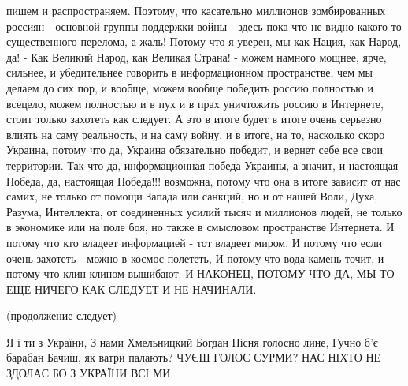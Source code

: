 пишем и распространяем. Поэтому, что касательно миллионов зомбированных россиян
- основной группы поддержки войны - здесь пока что не видно какого то
существенного перелома, а жаль! Потому что я уверен, мы как Нация, как Народ, да! - Как Великий Народ, как Великая Страна! -
можем намного мощнее, ярче, сильнее, и убедительнее говорить в информационном
пространстве, чем мы делаем до сих пор, и вообще, можем вообще победить россию
полностью и всецело, можем полностью и в пух и в прах уничтожить россию в
Интернете, стоит только захотеть как следует. А это в итоге будет в итоге очень серьезно влиять на саму реальность, и на саму войну, и в итоге, на то, насколько скоро Украина, потому что да, Украина обязательно победит, и вернет себе все свои территории. Так что да, информационная победа Украины, а значит, и настоящая Победа, да, настоящая Победа!!! возможна, потому что она в итоге зависит от нас самих, не только от помощи Запада или санкций, но и от нашей Воли, Духа, Разума, Интеллекта, от соединенных усилий тысяч и миллионов людей, не только в экономике или на поле боя, но также в смысловом пространстве Интернета. И потому что кто владеет информацией - тот владеет миром. И потому что если очень захотеть - можно в космос полететь, И потому что вода камень точит, и потому что клин клином вышибают. И НАКОНЕЦ, ПОТОМУ ЧТО ДА, МЫ ТО ЕЩЕ НИЧЕГО
КАК СЛЕДУЕТ И НЕ НАЧИНАЛИ.

(продолжение следует)

Я і ти з України,
З нами Хмельницкий Богдан
Пісня голосно лине,
Гучно б'є барабан
Бачиш, як ватри палають?
ЧУЄШ ГОЛОС СУРМИ?
НАС НІХТО НЕ ЗДОЛАЄ
БО З УКРАЇНИ ВСІ МИ 


